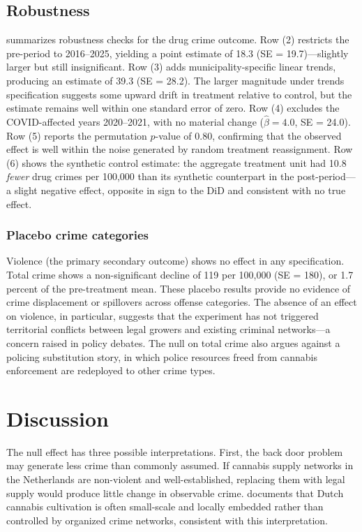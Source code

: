 \documentclass[12pt]{article}
\begin{document}
\subsection{Robustness}



 summarizes robustness checks for the drug crime outcome. Row (2) restricts the pre-period to 2016--2025, yielding a point estimate of 18.3 (SE = 19.7)---slightly larger but still insignificant. Row (3) adds municipality-specific linear trends, producing an estimate of 39.3 (SE = 28.2). The larger magnitude under trends specification suggests some upward drift in treatment relative to control, but the estimate remains well within one standard error of zero. Row (4) excludes the COVID-affected years 2020--2021, with no material change ($\hat{\beta} = 4.0$, SE = 24.0). Row (5) reports the permutation $p$-value of 0.80, confirming that the observed effect is well within the noise generated by random treatment reassignment. Row (6) shows the synthetic control estimate: the aggregate treatment unit had 10.8 \textit{fewer} drug crimes per 100,000 than its synthetic counterpart in the post-period---a slight negative effect, opposite in sign to the DiD and consistent with no true effect.

\subsubsection*{Placebo crime categories} Violence (the primary secondary outcome) shows no effect in any specification. Total crime shows a non-significant decline of 119 per 100,000 (SE = 180), or 1.7 percent of the pre-treatment mean. These placebo results provide no evidence of crime displacement or spillovers across offense categories. The absence of an effect on violence, in particular, suggests that the experiment has not triggered territorial conflicts between legal growers and existing criminal networks---a concern raised in policy debates. The null on total crime also argues against a policing substitution story, in which police resources freed from cannabis enforcement are redeployed to other crime types.


\section{Discussion}

The null effect has three possible interpretations. First, the back door problem may generate less crime than commonly assumed. If cannabis supply networks in the Netherlands are non-violent and well-established, replacing them with legal supply would produce little change in observable crime. \citet{decorte2010small} documents that Dutch cannabis cultivation is often small-scale and locally embedded rather than controlled by organized crime networks, consistent with this interpretation.
\end{document}
